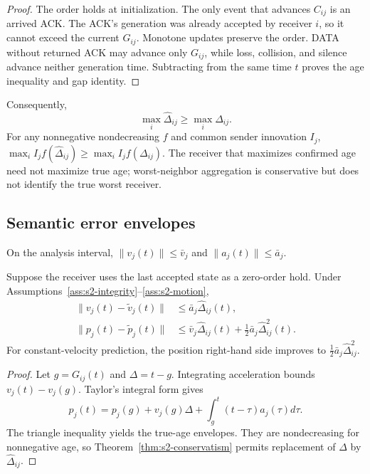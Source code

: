 \begin{proof}
The order holds at initialization.  The only event that advances $C_{ij}$ is
an arrived ACK.  The ACK's generation was already accepted by receiver $i$,
so it cannot exceed the current $G_{ij}$.  Monotone updates preserve the
order.  DATA without returned ACK may advance only $G_{ij}$, while loss,
collision, and silence advance neither generation time.  Subtracting from the
same time $t$ proves the age inequality and gap identity.
\end{proof}

Consequently,
\begin{equation}
\max_i\widehat\Delta_{ij}\ge\max_i\Delta_{ij}.
\label{eq:s2-worst-age}
\end{equation}
For any nonnegative nondecreasing $f$ and common sender innovation $I_j$,
$\max_i I_jf(\widehat\Delta_{ij})\ge\max_i I_jf(\Delta_{ij})$.  The receiver
that maximizes confirmed age need not maximize true age; worst-neighbor
aggregation is conservative but does not identify the true worst receiver.

\subsection{Semantic error envelopes}

\begin{assumption}
On the analysis interval,
$\|v_j(t)\|\le\bar v_j$ and $\|a_j(t)\|\le\bar a_j$.
\label{ass:s2-motion}
\end{assumption}

\begin{theorem}
Suppose the receiver uses the last accepted state as a zero-order hold.  Under
Assumptions~\ref{ass:s2-integrity}--\ref{ass:s2-motion},
\begin{align}
\|v_j(t)-\widetilde v_j(t)\|
&\le \bar a_j\widehat\Delta_{ij}(t),
\label{eq:s2-vel-envelope}\\
\|p_j(t)-\widetilde p_j(t)\|
&\le \bar v_j\widehat\Delta_{ij}(t)
+\tfrac12\bar a_j\widehat\Delta_{ij}^2(t).
\label{eq:s2-pos-envelope}
\end{align}
For constant-velocity prediction, the position right-hand side improves to
$\tfrac12\bar a_j\widehat\Delta_{ij}^2$.
\label{thm:s2-semantic-envelope}
\end{theorem}

\begin{proof}
Let $g=G_{ij}(t)$ and $\Delta=t-g$.  Integrating acceleration bounds
$v_j(t)-v_j(g)$.  Taylor's integral form gives
\[
p_j(t)=p_j(g)+v_j(g)\Delta
+\int_g^t(t-\tau)a_j(\tau)d\tau.
\]
The triangle inequality yields the true-age envelopes.  They are
nondecreasing for nonnegative age, so
Theorem~\ref{thm:s2-conservatism} permits replacement of $\Delta$ by
$\widehat\Delta_{ij}$.
\end{proof}

